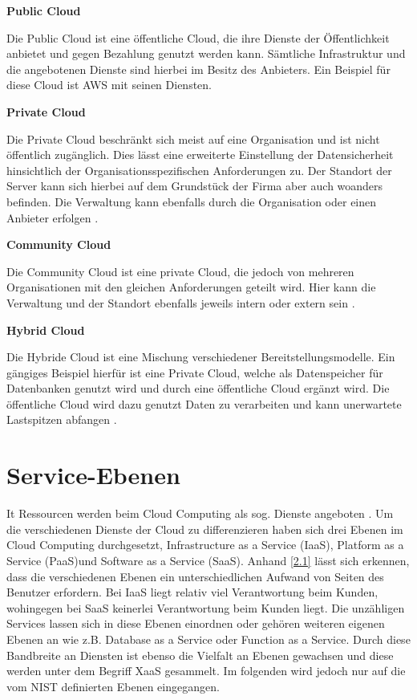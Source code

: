 \textbf{Public Cloud}

Die Public Cloud ist eine öffentliche Cloud, die ihre Dienste der Öffentlichkeit anbietet und gegen Bezahlung genutzt werden kann. Sämtliche Infrastruktur und die angebotenen Dienste sind hierbei im Besitz des Anbieters. Ein Beispiel für diese Cloud ist AWS mit seinen Diensten\cite*[]{Wirtz2022}.

\textbf{Private Cloud}

Die Private Cloud beschränkt sich meist auf eine Organisation und ist nicht öffentlich zugänglich. Dies lässt eine erweiterte Einstellung der Datensicherheit hinsichtlich der Organisationsspezifischen Anforderungen zu\cite*[]{Wirtz2022}. Der Standort der Server kann sich hierbei auf dem Grundstück der Firma aber auch woanders befinden. Die Verwaltung kann ebenfalls durch die Organisation oder einen Anbieter erfolgen \cite*[]{DAAS}.

\textbf{Community Cloud}

Die Community Cloud ist eine private Cloud, die jedoch von mehreren Organisationen mit den gleichen Anforderungen geteilt wird. Hier kann die Verwaltung und der Standort ebenfalls jeweils intern oder extern sein \cite*[]{DAAS}.

\textbf{Hybrid Cloud}

Die Hybride Cloud ist eine Mischung verschiedener Bereitstellungsmodelle. Ein gängiges Beispiel hierfür ist eine Private Cloud, welche als Datenspeicher für Datenbanken genutzt wird und durch eine öffentliche Cloud ergänzt wird. Die öffentliche Cloud wird dazu genutzt Daten zu verarbeiten und kann unerwartete Lastspitzen abfangen \cite*[]{DAAS}.

\section{Service-Ebenen}
It Ressourcen werden beim Cloud Computing als sog. Dienste angeboten \cite*[]{Zarnekow}. Um die verschiedenen Dienste der Cloud zu differenzieren haben sich drei Ebenen im Cloud Computing durchgesetzt, Infrastructure as a Service (IaaS), Platform as a Service (PaaS)und Software as a Service (SaaS). Anhand \autoref{2.1} lässt sich erkennen, dass die verschiedenen Ebenen ein unterschiedlichen Aufwand von Seiten des Benutzer erfordern. Bei IaaS liegt relativ viel Verantwortung beim Kunden, wohingegen bei SaaS keinerlei Verantwortung beim Kunden liegt. Die unzähligen Services lassen sich in diese Ebenen einordnen oder gehören weiteren eigenen Ebenen an wie z.B. Database as a Service oder Function as a Service. Durch diese Bandbreite an Diensten ist ebenso die Vielfalt an Ebenen gewachsen und diese werden unter dem Begriff XaaS gesammelt. Im folgenden wird jedoch nur auf die vom NIST definierten Ebenen eingegangen.


